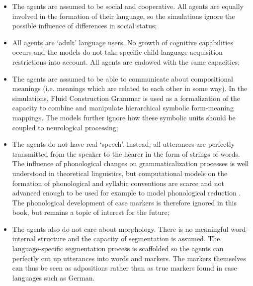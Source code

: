\begin{itemize}
\item The agents are assumed to be social and cooperative. All agents are equally involved in the formation of their language, so the simulations ignore the possible influence of differences in social status;
\item All agents are `adult' language users. No growth of cognitive capabilities occurs and the models do not take specific child language acquisition restrictions into account. All agents are endowed with the same capacities;
\item The agents are assumed to be able to communicate about compositional meanings (i.e. meanings which are related to each other in some way). In the simulations, Fluid Construction Grammar is used as a formalization of the capacity to combine and manipulate hierarchical symbolic form-meaning mappings. The models further ignore how these symbolic units should be coupled to neurological processing;
\item The agents do not have real `speech'. Instead, all utterances are perfectly transmitted from the speaker to the hearer in the form of strings of words. The influence of phonological changes on grammaticalization processes is well understood in theoretical linguistics, but computational models on the formation of phonological and syllabic conventions are scarce and not advanced enough to be used for example to model phonological reduction \citep[although see][]{steels98stochasticity}. The phonological development of case markers is therefore ignored in this book, but remains a topic of interest for the future;
\item The agents also do not care about morphology. There is no meaningful word-internal structure and the capacity of segmentation is assumed. The language-specific segmentation process is scaffolded so the agents can perfectly cut up utterances into words and markers. The markers themselves can thus be seen as adpositions rather than as true markers found in case languages such as German.
\end{itemize}

